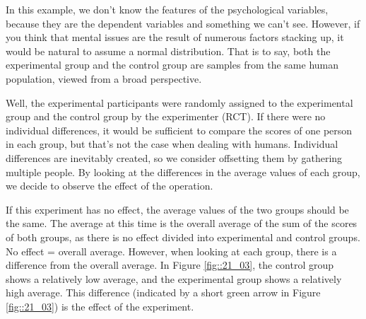 \documentclass{ltjbook}
\begin{document}
In this example, we don't know the features of the psychological variables, because they are the dependent variables and something we can't see. However, if you think that mental issues are the result of numerous factors stacking up, it would be natural to assume a normal distribution. That is to say, both the experimental group and the control group are samples from the same human population, viewed from a broad perspective.

Well, the experimental participants were randomly assigned to the experimental group and the control group by the experimenter (RCT). If there were no individual differences, it would be sufficient to compare the scores of one person in each group, but that's not the case when dealing with humans. Individual differences are inevitably created, so we consider offsetting them by gathering multiple people. By looking at the differences in the average values of each group, we decide to observe the effect of the operation.

If this experiment has no effect, the average values of the two groups should be the same. The average at this time is the overall average of the sum of the scores of both groups, as there is no effect divided into experimental and control groups. No effect = overall average. However, when looking at each group, there is a difference from the overall average. In Figure \ref{fig::21_03}, the control group shows a relatively low average, and the experimental group shows a relatively high average. This difference (indicated by a short green arrow in Figure \ref{fig::21_03}) is the effect of the experiment.
\end{document}
